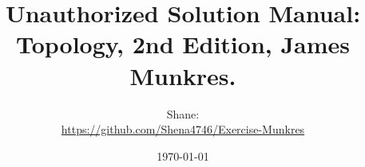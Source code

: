 \documentclass[a4paper,12pt]{article}
\begin{document}
\title{Unauthorized Solution Manual: Topology, 2nd Edition, James Munkres.}
\author{Shane:\\ \url{https://github.com/Shena4746/Exercise-Munkres}}
\date{\today}
\maketitle
\end{document}

